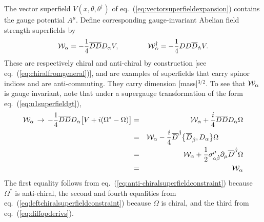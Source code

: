 \documentclass[11pt]{article}
\def\beq{\begin{eqnarray}}
\def\eeq{\end{eqnarray}}
\def\Dcon{\overline D}
\begin{document}
The vector superfield $V(x,\theta,\theta^\dagger)$ of 
eq.~(\ref{eq:vectorsuperfieldexpansion})
contains the gauge potential $A^\mu$. 
Define corresponding gauge-invariant Abelian
field strength superfields by 
\beq
{\cal W}_\alpha = -\frac{1}{4} \Dcon\Dcon D_\alpha V,
\qquad\qquad
{\cal W}^\dagger_{\dot\alpha} = -\frac{1}{4} DD \Dcon_{\dot\alpha} V.
\label{eq:defineWalpha}
\eeq
These
are respectively chiral and anti-chiral by construction 
[see eq.~(\ref{eq:chiralfromgeneral})], and are examples of 
superfields that carry spinor indices and are anti-commuting. They carry 
dimension [mass]$^{3/2}$.
To see that ${\cal W}_\alpha$ is gauge invariant, note that under 
a supergauge transformation of the form eq.~(\ref{eq:u1superfieldgt}),
\beq
{\cal W}_\alpha \,\rightarrow\, 
-\frac{1}{4} \Dcon\Dcon D_\alpha \bigl [V
+ i (\Omega^* - \Omega) \bigr ]
\label{eq:Walphagione}
&=& 
{\cal W}_\alpha + \frac{i}{4} \Dcon\Dcon D_\alpha \Omega
\\
&=&
{\cal W}_\alpha - \frac{i}{4} \Dcon^{\dot\beta}\bigl \lbrace
\Dcon_{\dot\beta}, D_\alpha \bigr \rbrace \Omega \phantom{xxxxxx}
\\
&=&
{\cal W}_\alpha + \frac{1}{2} \sigma^\mu_{\alpha\dot\beta} 
\partial_\mu \Dcon^{\dot\beta}\Omega
\\
&=&
{\cal W}_\alpha
\label{eq:Walphagitwo}
\eeq
The first equality follows from eq.~(\ref{eq:anti-chiralsuperfieldconstraint})
because $\Omega^*$ is anti-chiral, the second and fourth equalities from
eq.~(\ref{eq:leftchiralsuperfieldconstraint}) because $\Omega$ is 
chiral, and the third from eq.~(\ref{eq:diffopderivs}).
\end{document}
